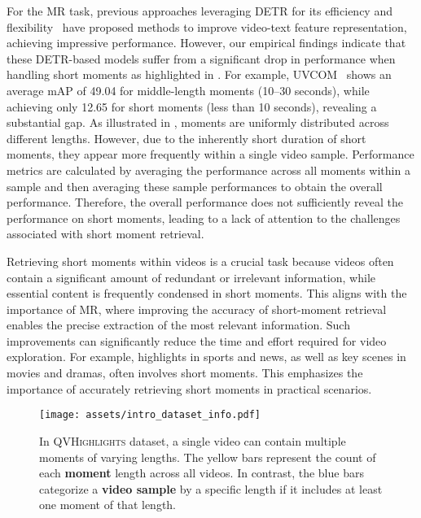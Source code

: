 For the MR task, previous approaches leveraging DETR for its efficiency and flexibility~\cite{lei2021detecting_Moment-DETR,moon2023query_QD-DETR,sun2024tr_TR-DETR, zhang2024temporally_TaskWeave, xiao2024bridging_UVCOM} have proposed methods to improve video-text feature representation, achieving impressive performance. 
However, our empirical findings indicate that these DETR-based models suffer from a significant drop in performance when handling short moments as highlighted in .
For example, UVCOM~\cite{xiao2024bridging_UVCOM} shows an average mAP of 49.04 for middle-length moments (10–30 seconds), 
while achieving only 12.65 for short moments (less than 10 seconds), revealing a substantial gap. As illustrated in , moments are uniformly distributed across different lengths. However, due to the inherently short duration of short moments, they appear more frequently within a single video sample. Performance metrics are calculated by averaging the performance across all moments within a sample and then averaging these sample performances to obtain the overall performance. Therefore, the overall performance does not sufficiently reveal the performance on short moments, leading to a lack of attention to the challenges associated with short moment retrieval.

Retrieving short moments within videos is a crucial task because videos often contain a significant amount of redundant or irrelevant information, while essential content is frequently condensed in short moments. This aligns with the importance of MR, where improving the accuracy of short-moment retrieval enables the precise extraction of the most relevant information. 
Such improvements can significantly reduce the time and effort required for video exploration.
For example, highlights in sports and news, as well as key scenes in movies and dramas, often involves short moments. This emphasizes the importance of accurately retrieving short moments in practical scenarios.

\begin{figure}[tb]
    \centering
    \texttt{[image: assets/intro\_dataset\_info.pdf]}
    \caption{In \textsc{QVHighlights} dataset, a single video can contain multiple moments of varying lengths. The yellow bars represent the count of each \textbf{moment} length across all videos. In contrast, the blue bars categorize a \textbf{video sample} by a specific length if it includes at least one moment of that length.
    }
    \label{fig:intro_dataset_info}
\end{figure}

